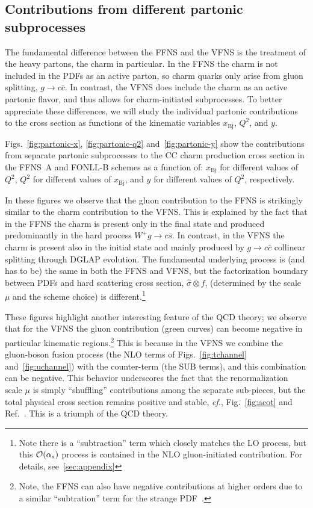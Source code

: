 \documentclass[pdftex,twocolumn,epjc3]{svjour3}          %
\newcommand{\xbj}{\ensuremath{x_{\text{Bj}}}\xspace}
\newcommand{\fonll} {{FONLL-B}\xspace}
\newcommand{\ffns} {{FFNS~A}\xspace}
\begin{document}
%
\subsection{Contributions from different partonic subprocesses}
\label{sec:thpred-partonic}

%

The fundamental difference between the FFNS and the VFNS is the
treatment of the heavy partons, the charm in particular. In the FFNS
the charm is not included in the PDFs as an active parton, so charm
quarks only arise from gluon splitting, $g\to c \bar{c}$. In contrast,
the VFNS does include the charm as an active partonic flavor, and thus
allows for charm-initiated subprocesses.
%
To better appreciate these differences, we will study the individual
partonic contributions to the cross section as functions of the
kinematic variables \xbj, $Q^2$, and $y$.


Figs.~\ref{fig:partonic-x}, \ref{fig:partonic-q2}
and~\ref{fig:partonic-y} show the contributions from separate partonic
subprocesses to the CC charm production cross section in the \ffns and
\fonll schemes as a function of: \xbj for different values of $Q^2$,
$Q^2$ for different values of \xbj, and $y$ for different values of
$Q^2$, respectively.

%
%
In these figures we observe that the gluon contribution to the FFNS is
strikingly similar to the charm contribution to the VFNS.
%
This is explained by the fact that in the FFNS the charm is present
only in the final state and produced predominantly in the hard process
$W^+ g \to c\bar{s}$.
%
In contrast, in the VFNS the charm is present also
in the initial state and mainly produced by $g\to c\bar{c}$ collinear
splitting through DGLAP evolution.
%
The fundamental underlying process is (and has to be) the same in both
the FFNS and VFNS, but the factorization boundary between PDFs and
hard scattering cross section, $\hat{\sigma}\otimes f$, (determined by
the scale $\mu$ and the scheme choice) is different.\footnote{%
  Note
  there is a ``subtraction'' term which closely matches the LO
  process, but this ${\cal O}(\alpha_s)$ process is contained in the
  NLO gluon-initiated contribution.  For details,
  see~\ref{sec:appendix} 
}


These figures highlight another interesting feature of the QCD theory;
we observe that for the VFNS the gluon contribution (green curves) can
become negative in particular kinematic regions.\footnote{%
  Note, the FFNS can also have  negative contributions at higher orders due
  to a similar ``subtration'' term for the strange PDF~\cite{Gao:2017kkx}.
  }
This is because in the VFNS we combine the gluon-boson fusion process
(the NLO terms of Figs.~\ref{fig:tchannel} and~\ref{fig:uchannel})
with the counter-term  (the SUB terms),
and this combination can be negative.
%
This behavior underscores the fact that the renormalization scale $\mu$
is simply ``shuffling'' contributions among the separate sub-pieces,
but the total physical cross section remains positive and stable,
{\it cf.}, Fig.~\ref{fig:acot} and Ref.~\cite{Aivazis:1993pi}.
This is a triumph of the QCD theory. 
\end{document}

